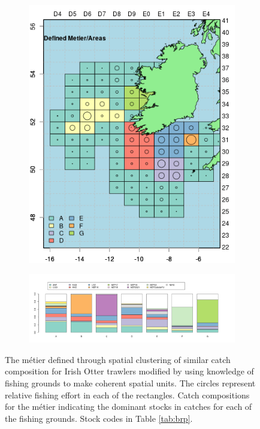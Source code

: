 \documentclass[12pt, halfline, a4paper]{ouparticle}
\begin{document}
\begin{figure}[!ht]
	\centering
\begin{subfigure}
	\centering
	\includegraphics[width=0.8\linewidth]{figures/Final_Metier_locations}
\end{subfigure}
\begin{subfigure}
	\centering
	\includegraphics[width=0.8\linewidth]{figures/Final_Metier_catchcomp}
\end{subfigure}
\caption{The métier defined through spatial clustering of similar catch
	composition for Irish Otter trawlers modified by using knowledge of
	fishing grounds to make coherent spatial units. The circles represent
	relative fishing effort in each of the rectangles. Catch compositions
	for the métier indicating the dominant stocks in catches for each of
	the fishing grounds. Stock codes in Table \ref{tab:brp}.} 
	\label{fig:metier}

\end{figure}	
\end{document}
